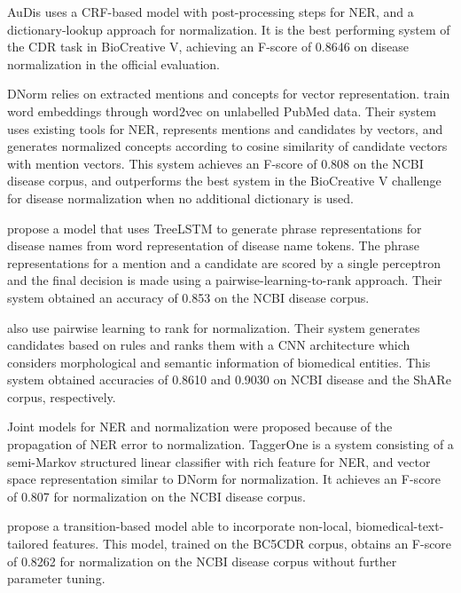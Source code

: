 \documentclass{bioinfo}
\begin{document}
AuDis \citep{lee-et-al:2016} uses a CRF-based model with post-processing steps for NER, and a dictionary-lookup approach for normalization.
It is the best performing system of the CDR task in BioCreative V, achieving an F-score of 0.8646 on disease normalization in the official evaluation.

DNorm relies on extracted mentions and concepts for vector representation.
\cite{cho-et-al:2017} train word embeddings through word2vec on unlabelled PubMed data.
Their system uses existing tools for NER, represents mentions and candidates by vectors, and generates normalized concepts according to cosine similarity of candidate vectors with mention vectors.
This system achieves an F-score of 0.808 on the NCBI disease corpus, and outperforms the best system in the BioCreative V challenge for disease normalization when no additional dictionary is used.

\cite{liu-xu:2018:NLPCC} propose a model that uses TreeLSTM to generate phrase representations for disease names from word representation of disease name tokens.
The phrase representations for a mention and a candidate are scored by a single perceptron and the final decision is made using a pairwise-learning-to-rank approach.
Their system obtained an accuracy of 0.853 on the NCBI disease corpus.  %

\cite{lihaodi-et-al:2017} also use pairwise learning to rank for normalization.
Their system generates candidates based on rules and ranks them with a CNN architecture which considers morphological and semantic information of biomedical entities.
This system obtained accuracies of 0.8610 and 0.9030 on NCBI disease and the ShARe corpus, respectively.



Joint models for NER and normalization were proposed because of the propagation of NER error to normalization.
TaggerOne \citep{leaman-lu:2016} is a system consisting of a semi-Markov structured linear classifier with rich feature for NER, and vector space representation similar to DNorm for normalization.
It achieves an F-score of 0.807 for normalization on the NCBI disease corpus.  %

\cite{lou-et-al:2017} propose a transition-based model able to incorporate non-local, biomedical-text-tailored features.
This model, trained on the BC5CDR corpus, obtains an F-score of 0.8262 for normalization on the NCBI disease corpus without further parameter tuning.
\end{document}
